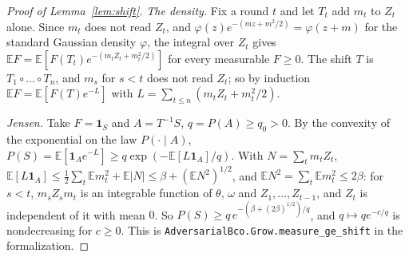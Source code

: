 \documentclass[11pt]{amsart}
\theoremstyle{definition}
\numberwithin{equation}{section}
\newcommand{\E}{\mathbb{E}}
\begin{document}
\begin{proof}[Proof of Lemma~\ref{lem:shift}]
\emph{The density.} Fix a round $t$ and let $T_t$ add $m_t$ to $Z_t$ alone. Since $m_t$ does not read $Z_t$, and $\varphi(z)e^{-(mz+m^2/2)}=\varphi(z+m)$ for the standard Gaussian density $\varphi$, the integral over $Z_t$ gives $\E F=\E[F(T_t)e^{-(m_tZ_t+m_t^2/2)}]$ for every measurable $F\ge0$. The shift $T$ is $T_1\circ\dots\circ T_n$, and $m_s$ for $s<t$ does not read $Z_t$; so by induction $\E F=\E[F(T)e^{-L}]$ with $L=\sum_{t\le n}(m_tZ_t+m_t^2/2)$.

\emph{Jensen.} Take $F=\mathbf 1_S$ and $A=T^{-1}S$, $q=P(A)\ge q_0>0$. By the convexity of the exponential on the law $P(\cdot\mid A)$, $P(S)=\E[\mathbf 1_Ae^{-L}]\ge q\exp(-\E[L\mathbf 1_A]/q)$. With $N=\sum_tm_tZ_t$, $\E[L\mathbf 1_A]\le\frac12\sum_t\E m_t^2+\E|N|\le\beta+(\E N^2)^{1/2}$, and $\E N^2=\sum_t\E m_t^2\le2\beta$: for $s<t$, $m_sZ_sm_t$ is an integrable function of $\theta$, $\omega$ and $Z_1,\dots,Z_{t-1}$, and $Z_t$ is independent of it with mean $0$. So $P(S)\ge q\,e^{-(\beta+(2\beta)^{1/2})/q}$, and $q\mapsto qe^{-c/q}$ is nondecreasing for $c\ge0$.
This is \texttt{AdversarialBco.Grow.measure\_ge\_shift} in the formalization.
\end{proof}
\end{document}
